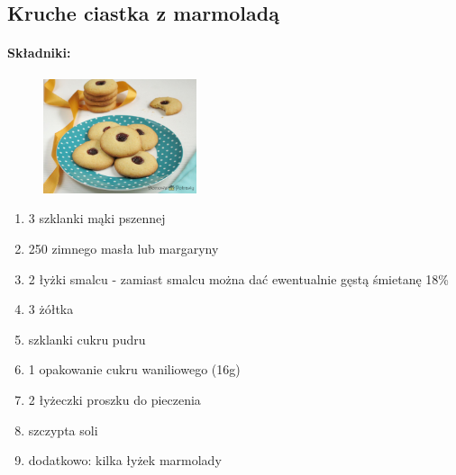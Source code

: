 \documentclass{article}
\begin{document}
    \subsection{Kruche ciastka z marmoladą}
    \bigskip

    \paragraph{Składniki:}
    \begin{figure}
        \includegraphics[width=0.4\textwidth]{kruche_ciasteczka_marmolada.jpg}
    \end{figure}
    \begin{enumerate}
        \item 3 szklanki mąki pszennej
        \item 250 zimnego masła lub margaryny
        \item 2 łyżki smalcu - zamiast smalcu można dać ewentualnie gęstą
            śmietanę 18\%
        \item 3 żółtka
        \item {} szklanki cukru pudru
        \item 1 opakowanie cukru waniliowego (16g)
        \item 2 łyżeczki proszku do pieczenia
        \item szczypta soli
        \item dodatkowo: kilka łyżek marmolady
    \end{enumerate}
\end{document}
